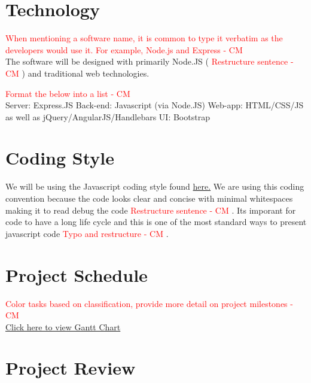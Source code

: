 \documentclass{article}
\begin{document}
\section{Technology}
\textcolor{red}{When mentioning a software name, it is common to type it verbatim as the developers would use it. For example, Node.js and Express - CM} \\
The software will be designed with primarily Node.JS (\textcolor{red}{ Restructure sentence - CM} ) and traditional web technologies.

\textcolor{red}{ Format the below into a list - CM}  \\
Server: Express.JS
Back-end: Javascript (via Node.JS)
Web-app: HTML/CSS/JS as well as jQuery/AngularJS/Handlebars
UI: Bootstrap

\section{Coding Style}
We will be using the Javascript coding style found \href{http://javascript.crockford.com/code.html}{here.}
We are using this coding convention because the code looks clear and concise with minimal whitespaces making it to read debug the code \textcolor{red}{Restructure sentence - CM} . Its imporant for code to have a long life cycle and this is one of the most standard ways to present javascript code \textcolor{red}{Typo and restructure - CM} .

\section{Project Schedule}
\textcolor{red}{ Color tasks based on classification, provide more detail on project milestones - CM} \\
\href{run:GanttChart.gan}{Click here to view Gantt Chart}

\section{Project Review}
\end{document}
